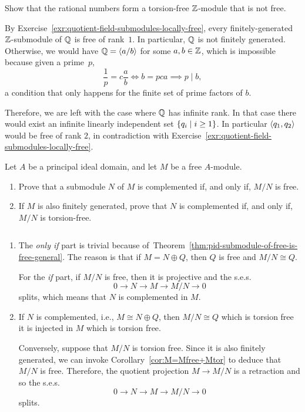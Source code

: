 \begin{exr}
    Show that the rational numbers form a torsion-free\/ $\mathbb{Z}$-module that is not free.
\end{exr}

\begin{solution}
    By Exercise~\ref{exr:quotient-field-submodules-locally-free}, every finitely-generated $\mathbb{Z}$-submodule of $\mathbb{Q}$ is free of rank~$1$. In particular, $\mathbb{Q}$ is not finitely generated. Otherwise, we would have $\mathbb{Q}=\langle a/b\rangle$ for some $a,b\in\mathbb{Z}$, which is impossible because given a prime~$p$,
    $$
        \frac1p=c\frac ab \iff b= pca\implies p\mid b,
    $$
    a condition that only happens for the finite set of prime factors of $b$.

    Therefore, we are left with the case where $\mathbb{Q}$ has infinite rank. In that case there would exist an infinite linearly independent set $\{q_i\mid i\ge1\}$. In particular $\langle q_1,q_2\rangle$ would be free of rank $2$, in contradiction with Exercise~\ref{exr:quotient-field-submodules-locally-free}.
\end{solution}

\begin{exr}
    Let\/ $A$ be a principal ideal domain, and let\/ $M$ be a free\/ $A$-module.  
    \begin{enumerate}[\rm a)]
        \item Prove that a submodule\/ $N$ of\/ $M$ is complemented if, and only if, $M/N$ is free.
        
        \item If\/ $M$ is also finitely generated, prove that\/ $N$ is complemented if, and only if, $M/N$ is torsion-free.
    \end{enumerate}
\end{exr}

\begin{solution}${}$
    \begin{enumerate}[\rm a)]
        \item The \textit{only if\/} part is trivial because of~Theorem~\ref{thm:pid-submodule-of-free-is-free-general}. The reason is that if $M=N\oplus Q$, then $Q$ is free and $M/N\cong Q$.

        For the \textit{if\/} part, if $M/N$ is free, then it is projective and the s.e.s.
        $$
            0\to N\to M\to M/N\to0
        $$
        splits, which means that $N$ is complemented in $M$.
        
        
        \item If $N$ is complemented, i.e., $M\cong N\oplus Q$, then $M/N\cong Q$ which is torsion free it is injected in $M$ which is torsion free.

        Conversely, suppose that $M/N$ is torsion free. Since it is also finitely generated, we can invoke Corollary~\ref{cor:M=Mfree+Mtor} to deduce that $M/N$ is free. Therefore, the quotient projection $M\to M/N$ is a retraction and so the s.e.s.
        $$
            0\to N\to M\to M/N\to 0
        $$
        splits.
    \end{enumerate}
\end{solution}

